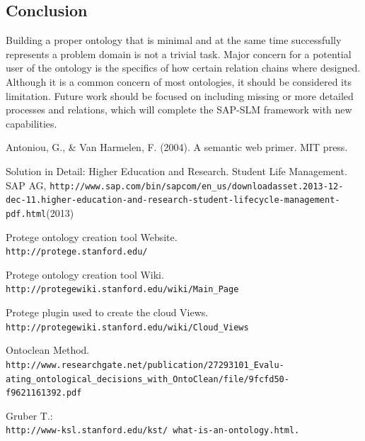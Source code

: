 \documentclass{article}    %
\begin{document}
\subsection{Conclusion}
%
Building a proper ontology that is minimal and at the same time successfully represents a problem domain is not a trivial task. Major concern for a potential user of the ontology is the specifics of how certain relation chains where designed. Although it is a common concern of most ontologies, it should be considered its limitation. Future work should be focused on including missing or more detailed processes and relations, which will complete the SAP-SLM framework with new capabilities.
%
%
\newpage
\begin{thebibliography}{99}
%
Antoniou, G., \& Van Harmelen, F. (2004). A semantic web primer. MIT press.

Solution in Detail: Higher Education and Research. Student Life Management.
SAP AG, \texttt{http://www.sap.com/bin/sapcom/en\_us/downloadasset.2013-12-dec-11.higher-education-and-research-student-lifecycle-\newline management-pdf.html}(2013)

Protege ontology creation tool Website.\\
\texttt{http://protege.stanford.edu/}

Protege ontology creation tool Wiki.\\
\texttt{http://protegewiki.stanford.edu/wiki/Main\_Page}

Protege plugin used to create the cloud Views.\\
\texttt{http://protegewiki.stanford.edu/wiki/Cloud\_Views}

Ontoclean Method.\\
\texttt{http://www.researchgate.net/publication/27293101\_Evalu-\newline
ating\_ontological\_decisions\_with\_OntoClean/file/9fcfd50-\newline
f9621161392.pdf}

Gruber T.:
\\
\texttt{http://www-ksl.stanford.edu/kst/ what-is-an-ontology.html.} 



\end{thebibliography}
\end{document}
